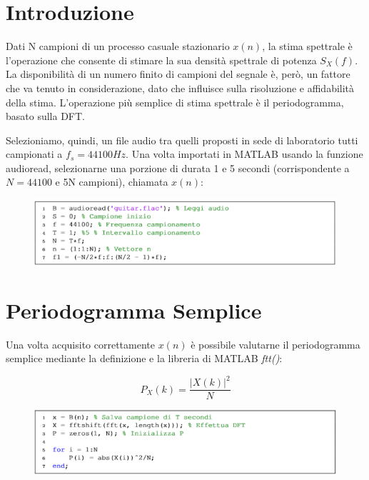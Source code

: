 \section{Introduzione}
Dati N campioni di un processo casuale stazionario $x(n)$, la stima spettrale è 
l’operazione che consente di stimare la sua densità spettrale di potenza 
$S_X(f)$. La disponibilità di un numero ﬁnito di campioni del segnale è, però, 
un fattore che va tenuto in considerazione, dato che inﬂuisce sulla risoluzione 
e aﬃdabilità della stima. L’operazione più semplice di stima spettrale è il 
periodogramma, basato sulla DFT.
\par
Selezioniamo, quindi, un ﬁle audio tra quelli proposti in sede di laboratorio 
tutti campionati a $f_s = 44100 Hz$. Una volta importati in MATLAB usando la 
funzione audioread, selezionarne una porzione di durata 1 e 5 secondi 
(corrispondente a $N = 44100$ e 5N campioni), chiamata $x(n)$: 

\begin{figure}[H]
	\centering
	\includegraphics[width=.8\textwidth]{./images/cap4/acquisizione.png}
\end{figure}

\section{Periodogramma Semplice}
Una volta acquisito correttamente $x(n)$ è possibile valutarne il periodogramma 
semplice mediante la deﬁnizione e la libreria di MATLAB \textit{ftt()}:

\begin{minipage}[t]{.25\textwidth}
	\vspace*{.75cm}
	\begin{equation*}
	P_X (k) = \frac{|X(k)|^2}{N}
	\end{equation*}
\end{minipage}
\hfill
\begin{minipage}[t]{.7\textwidth}
	\begin{figure}[H]
		\includegraphics[width=\textwidth]{./images/cap4/ifft.png}
	\end{figure}
\end{minipage}

